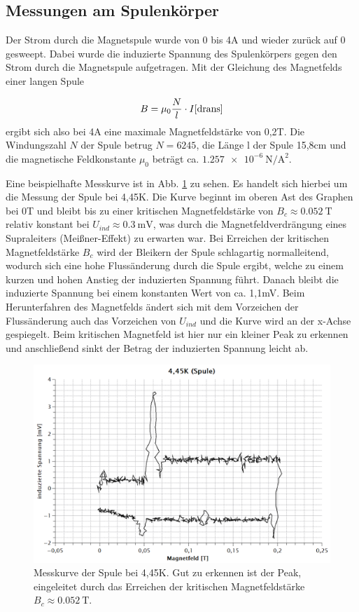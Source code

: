 \subsection{Messungen am Spulenkörper}
Der Strom durch die Magnetspule wurde von 0 bis 4A und wieder zurück auf 0 gesweept. Dabei wurde die induzierte Spannung des Spulenkörpers gegen den Strom durch die Magnetspule aufgetragen. Mit der Gleichung des Magnetfelds einer langen Spule 

\[B=\mu_{0}\dfrac{N}{l}\cdot I \cite{drans}\]
ergibt sich also bei 4A eine maximale Magnetfeldstärke von 0,2T. Die Windungszahl $N$ der Spule betrug $N=6245$, die Länge l der Spule 15,8cm und die magnetische Feldkonstante $\mu_{0}$ beträgt ca. $\SI{1,257e-6}{\newton\per\square\ampere}$.

Eine beispielhafte Messkurve ist in Abb. \ref{4,45} zu sehen. Es handelt sich hierbei um die Messung der Spule bei 4,45K. Die Kurve beginnt im oberen Ast des Graphen bei 0T und bleibt bis zu einer kritischen Magnetfeldstärke von $B_{c}\approx\SI{0,052}{\tesla}$ relativ konstant bei $U_{ind}\approx\SI{0,3}{\milli\volt}$, was durch die Magnetfeldverdrängung eines Supraleiters (Meißner-Effekt) zu erwarten war. Bei Erreichen der kritischen Magnetfeldstärke $B_{c}$ wird der Bleikern der Spule schlagartig normalleitend, wodurch sich eine hohe Flussänderung durch die Spule ergibt, welche zu einem kurzen und hohen Anstieg der induzierten Spannung führt. Danach bleibt die induzierte Spannung bei einem konstanten Wert von ca. 1,1mV. Beim Herunterfahren des Magnetfelds ändert sich mit dem Vorzeichen der Flussänderung auch das Vorzeichen von $U_{ind}$ und die Kurve wird an der x-Achse gespiegelt. Beim kritischen Magnetfeld ist hier nur ein kleiner Peak zu erkennen und anschließend sinkt der Betrag der induzierten Spannung leicht ab. 


\begin{figure}[H]
	\begin{center}
		\includegraphics[width=13cm]{4,45.png}
		\caption{Messkurve der Spule bei 4,45K. Gut zu erkennen ist der Peak, eingeleitet durch das Erreichen der kritischen Magnetfeldstärke $B_{c}\approx\SI{0,052}{\tesla}$.}
		\label{4,45}
	\end{center}
\end{figure}

